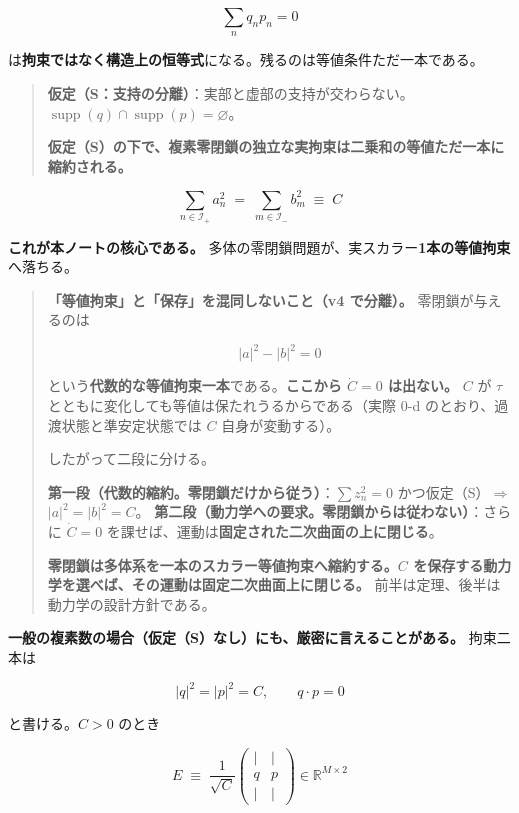 \documentclass[
  10pt,
]{ltjsarticle}
\begin{document}
\[\sum_n q_np_n = 0\]

は\textbf{拘束ではなく構造上の恒等式}になる。残るのは等値条件ただ一本である。

\begin{quote}
\textbf{仮定（S：支持の分離）}：実部と虚部の支持が交わらない。\(\operatorname{supp}(q) \cap \operatorname{supp}(p) = \varnothing\)。

\textbf{仮定（S）の下で、複素零閉鎖の独立な実拘束は二乗和の等値ただ一本に縮約される。}
\end{quote}

\[\boxed{\;\sum_{n \in \mathcal{I}_+} a_n^2 \;=\; \sum_{m \in \mathcal{I}_-} b_m^2 \;\equiv\; C\;}\]

\textbf{これが本ノートの核心である。}
多体の零閉鎖問題が、実スカラー\textbf{1本の等値拘束}へ落ちる。

\begin{quote}
\textbf{「等値拘束」と「保存」を混同しないこと（v4 で分離）。}
零閉鎖が与えるのは

\[\lvert a\rvert^2 - \lvert b\rvert^2 = 0\]

という\textbf{代数的な等値拘束一本}である。\textbf{ここから
\(\dot C = 0\) は出ない。} \(C\) が \(\tau\)
とともに変化しても等値は保たれうるからである（実際 0-d
のとおり、過渡状態と準安定状態では \(C\) 自身が変動する）。

したがって二段に分ける。

\textbf{第一段（代数的縮約。零閉鎖だけから従う）}：\(\sum z_n^2 = 0\)
かつ仮定（S）\(\Rightarrow\)
\(\lvert a\rvert^2 = \lvert b\rvert^2 = C\)。
\textbf{第二段（動力学への要求。零閉鎖からは従わない）}：さらに
\(\dot C = 0\) を課せば、運動は\textbf{固定された二次曲面の上に閉じる}。

\textbf{零閉鎖は多体系を一本のスカラー等値拘束へ縮約する。\(C\)
を保存する動力学を選べば、その運動は固定二次曲面上に閉じる。}
前半は定理、後半は動力学の設計方針である。
\end{quote}

\textbf{一般の複素数の場合（仮定（S）なし）にも、厳密に言えることがある。}
拘束二本は

\[\lvert q\rvert^2 = \lvert p\rvert^2 = C, \qquad q\cdot p = 0\]

と書ける。\(C > 0\) のとき

\[E \;\equiv\; \frac{1}{\sqrt{C}}\begin{pmatrix} | & | \\ q & p \\ | & | \end{pmatrix} \in \mathbb{R}^{M\times 2}\]
\end{document}
